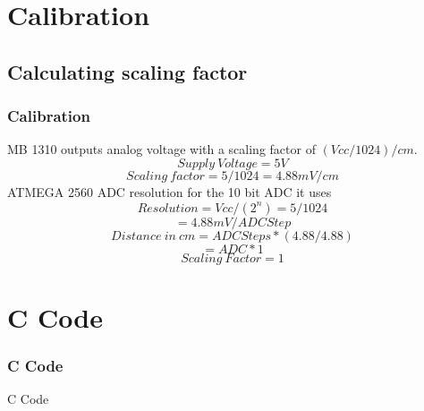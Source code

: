 \documentclass[table,10pt,red]{beamer}	%
\begin{document}
\section{Calibration} %
\subsection{Calculating scaling factor}
\begin{frame}
	\frametitle{Calibration}
	
		 \small MB 1310 outputs analog voltage with a scaling factor of $(V{cc}/1024)/cm.$
		 $$Supply\: Voltage = 5V$$
		 $$Scaling\: factor= 5/1024 = 4.88mV/cm$$
		 ATMEGA 2560 ADC resolution for the 10 bit ADC it uses $$ Resolution = Vcc/(2^n) =5/1024$$ $$= 4.88mV/ADC Step$$
		 $$Distance\: in\: cm = ADC Steps * (4.88/4.88)$$ $$= ADC * 1$$ 
		 $$Scaling\: Factor = 1$$
\end{frame}

\section{C Code} %


\begin{frame}
	\frametitle{C Code}
 		\begin{center}
 		\Huge C Code
 		\end{center}
\end{frame}
\end{document}

